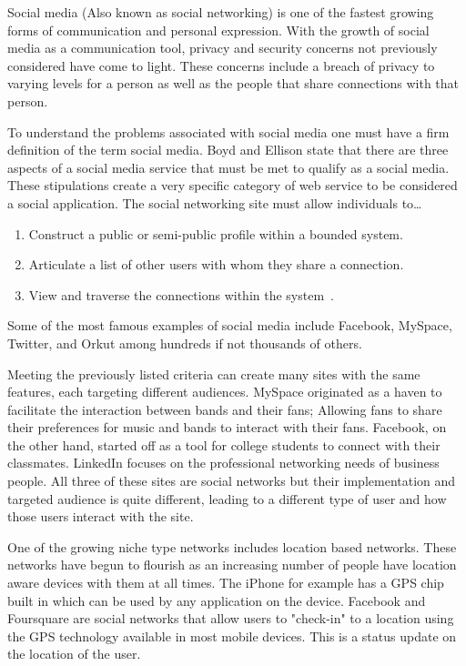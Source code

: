\maketitle
Social media (Also known as social networking) is one of the fastest growing forms 
of communication and personal expression. With the growth of social media as a communication 
tool, privacy and security concerns not previously considered have come to
light.  These concerns include a breach of privacy to varying levels for 
a person as well as the people that share connections with that person.

To understand the problems associated with social media one must have a firm 
definition of the term social media. Boyd and Ellison state that there are three aspects of a social 
media service that must be met to qualify as a social media. These stipulations create 
a very specific category of web service to be considered a social application.
The social networking site must allow individuals to\ldots
\begin{enumerate} 
    \item Construct a public or semi-public profile within a bounded system.  
    \item Articulate a list of other users with whom they share a connection.  
    \item View and traverse the connections within the
        system~\cite{boyd2008social}.
\end{enumerate}
Some of the most famous examples of social media include Facebook, MySpace, 
Twitter, and Orkut among hundreds if not thousands of others.

Meeting the previously listed criteria can create many sites with the same
features, each
targeting different audiences. MySpace originated as a haven to facilitate the
interaction between bands and their fans; Allowing fans to share their
preferences for music and bands to interact with their fans. Facebook, on the
other hand, started off as a tool for college students to connect with their
classmates. LinkedIn focuses on the professional networking needs of  business
people. All three of these sites are social networks but their implementation
and targeted audience is quite different, leading to a different type of user and
how those users interact with the site.

One of the growing niche type networks includes location based networks.  These
networks have begun to flourish as an increasing number of people have location aware
devices with them at all times. The iPhone for example has a GPS chip built in
which can be used by any application on the device. Facebook and Foursquare are
social networks that allow users to "check-in" to a location using the GPS
technology available in most mobile devices. This is a status update on the
location of the user.

